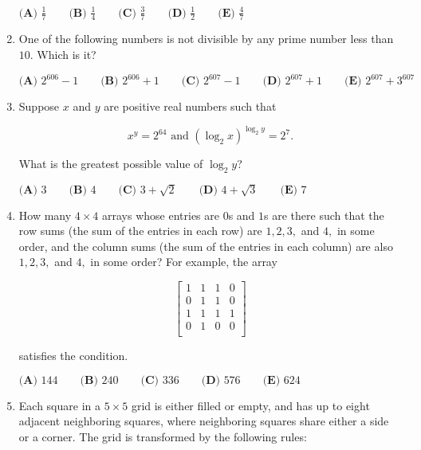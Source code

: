 \documentclass{article}
\begin{document}
\begin{enumerate}[label=\arabic*., itemsep=0.5em]
$\textbf{(A) }\frac{1}{7} \qquad \textbf{(B) }\frac{1}{4} \qquad \textbf{(C) }\frac{3}{7} \qquad \textbf{(D) }\frac{1}{2} \qquad \textbf{(E) }\frac{4}{7}$\par \vspace{0.5em}\item One of the following numbers is not divisible by any prime number less than $10.$ Which is it?

$\textbf{(A) } 2^{606}-1 \qquad\textbf{(B) } 2^{606}+1 \qquad\textbf{(C) } 2^{607}-1 \qquad\textbf{(D) } 2^{607}+1\qquad\textbf{(E) } 2^{607}+3^{607}$\par \vspace{0.5em}\item Suppose $x$ and $y$ are positive real numbers such that

\begin{equation*}
x^y=2^{64}\text{ and }(\log_2{x})^{\log_2{y}}=2^{7}.
\end{equation*}

What is the greatest possible value of $\log_2{y}$?

$\textbf{(A) }3 \qquad \textbf{(B) }4 \qquad \textbf{(C) }3+\sqrt{2} \qquad \textbf{(D) }4+\sqrt{3} \qquad \textbf{(E) }7$\par \vspace{0.5em}\item How many $4 \times 4$ arrays whose entries are $0$s and $1$s are there such that the row sums (the sum of the entries in each row) are $1, 2, 3,$ and $4,$ in some order, and the column sums (the sum of the entries in each column) are also $1, 2, 3,$ and $4,$ in some order? For example, the array

\begin{equation*}
\left[
  \begin{array}{cccc}
    1 & 1 & 1 & 0 \\
    0 & 1 & 1 & 0 \\
    1 & 1 & 1 & 1 \\
    0 & 1 & 0 & 0 \\
  \end{array}
\right]
\end{equation*}

satisfies the condition.

$\textbf{(A) }144 \qquad \textbf{(B) }240 \qquad \textbf{(C) }336 \qquad \textbf{(D) }576 \qquad \textbf{(E) }624$\par \vspace{0.5em}\item Each square in a $5 \times 5$ grid is either filled or empty, and has up to eight adjacent neighboring squares, where neighboring squares share either a side or a corner. The grid is transformed by the following rules:


\end{enumerate}
\end{document}
